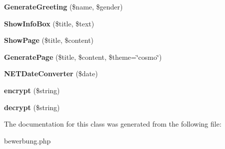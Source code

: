 \begin{DoxyCompactItemize}
\item 
\hypertarget{class_bewerbung_ac38dcd139133f7a94953db7ce9a0eb73}{{\bfseries Generate\-Greeting} (\$name, \$gender)}\label{class_bewerbung_ac38dcd139133f7a94953db7ce9a0eb73}

\item 
\hypertarget{class_bewerbung_ac942691ffa5e11981651268c6a69a597}{{\bfseries Show\-Info\-Box} (\$title, \$text)}\label{class_bewerbung_ac942691ffa5e11981651268c6a69a597}

\item 
\hypertarget{class_bewerbung_a7b8ea10bf5c26b38ed77954cd5a1fbf1}{{\bfseries Show\-Page} (\$title, \$content)}\label{class_bewerbung_a7b8ea10bf5c26b38ed77954cd5a1fbf1}

\item 
\hypertarget{class_bewerbung_a1f802507fdb8033f7ac76e7190bfda8c}{{\bfseries Generate\-Page} (\$title, \$content, \$theme=\char`\"{}cosmo\char`\"{})}\label{class_bewerbung_a1f802507fdb8033f7ac76e7190bfda8c}

\item 
\hypertarget{class_bewerbung_aad3e61e5e5229aaff68d9d96fd83fae8}{{\bfseries N\-E\-T\-Date\-Converter} (\$date)}\label{class_bewerbung_aad3e61e5e5229aaff68d9d96fd83fae8}

\item 
\hypertarget{class_bewerbung_a6403bd6b0893f015d09413b3781a0782}{{\bfseries encrypt} (\$string)}\label{class_bewerbung_a6403bd6b0893f015d09413b3781a0782}

\item 
\hypertarget{class_bewerbung_a96fd338d9ec82cdfc416266b2e6deba3}{{\bfseries decrypt} (\$string)}\label{class_bewerbung_a96fd338d9ec82cdfc416266b2e6deba3}

\end{DoxyCompactItemize}


The documentation for this class was generated from the following file\-:\begin{DoxyCompactItemize}
\item 
bewerbung.\-php\end{DoxyCompactItemize}
